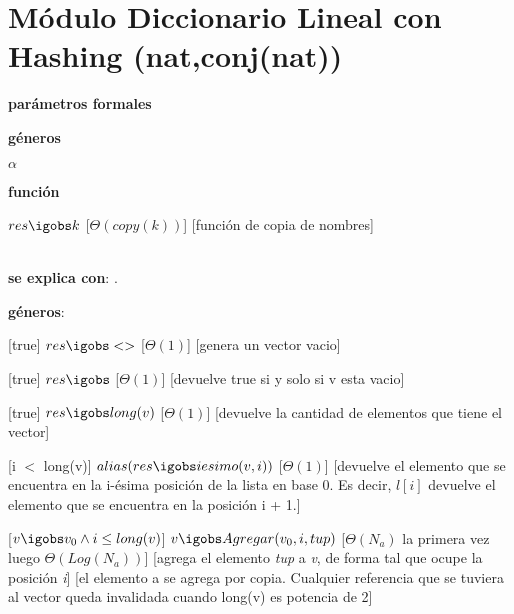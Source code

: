 \section{Módulo Diccionario Lineal con Hashing (nat,conj(nat))}

\begin{Interfaz}
  \textbf{parámetros formales}\parindent\\
  \parbox{1.7cm}{\textbf{géneros}}$\alpha$\\
  \parbox[t]{1.7cm}{\textbf{función}}\parbox[t]{.5\textwidth-\parindent-1.7cm}{%
    {$res \igobs k$}
    [$\Theta(copy(k))$]
    [función de copia de nombres]
  }\\
   	
  \textbf{se explica con}: .

  \textbf{géneros}: 



  
  [true]
  {$res \igobs <>$}
  [$\Theta(1)$]
  [genera un vector vacio]
  
  [true]
  {$res \igobs $}
  [$\Theta(1)$]
  [devuelve true si y solo si v esta vacio]
    
  [true]
  {$res \igobs long(v)$}
  [$\Theta(1)$]
  [devuelve la cantidad de elementos que tiene el vector]
    
  [i $<$ long(v)]
  {$alias(res \igobs iesimo(v, i))$}
  [$\Theta(1)$]
  [devuelve el elemento que se encuentra en la i-ésima posición de la lista en base 0. Es decir,   $l[i]$   devuelve el elemento que se encuentra en la posición i + 1.]
  
  
  
  [$v \igobs v_0 \land i \leq long(v) $]
  {$v \igobs Agregar(v_0,i,tup) $}
  [$\Theta(N_{a})$ la primera vez luego $ \Theta(Log(N_{a})) $]
  [agrega el elemento \textit{tup} a \textit{v}, de forma tal que ocupe la posición \textit{i}]  
 [el elemento a se agrega por copia. Cualquier referencia que se tuviera al vector queda invalidada cuando
long(v) es potencia de 2]


\end{Interfaz}

